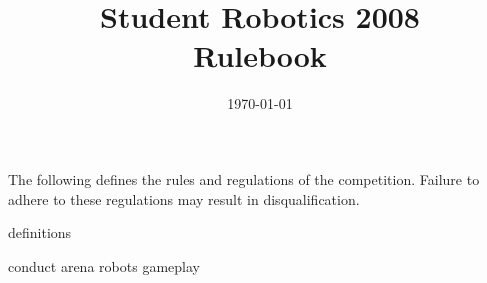\documentclass[a4paper, 12pt]{article}
\title {Student Robotics 2008\\ Rulebook}
\date{\today}
\begin{document}
\maketitle


\noindent The following defines the rules and regulations of the competition. Failure to adhere to these regulations may result in disqualification.

 {definitions}

 {conduct}
 {arena}
 {robots}
 {gameplay}
\end{document}
